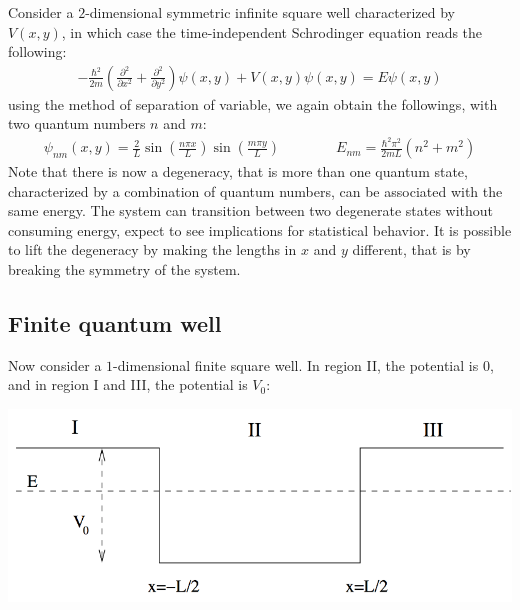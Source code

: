 \documentclass[11pt]{article}
\theoremstyle{break}
\theoremstyle{break}
\begin{document}
Consider a $2$-dimensional symmetric infinite square well characterized by $V(x,y)$, in which case the time-independent Schrodinger equation reads the following:
\begin{align*}
-\frac{\hbar^2}{2m}\left( \frac{\partial^2}{\partial x^2} + \frac{\partial^2}{\partial y^2}\right) \psi(x,y) + V(x,y)\psi(x,y) = E\psi(x,y)
\end{align*}
using the method of separation of variable, we again obtain the followings, with two quantum numbers $n$ and $m$:
\begin{align*}
\psi_{nm}(x,y) = \frac{2}{L}\sin\left( \frac{n\pi x}{L}\right) \sin\left( \frac{m\pi y}{L}\right)\qquad\qquad E_{nm} = \frac{\hbar^2\pi^2}{2mL}(n^2+m^2)
\end{align*}
Note that there is now a degeneracy, that is more than one quantum state, characterized by a combination of quantum numbers, can be associated with the same energy. The system can transition between two degenerate states without consuming energy, expect to see implications for statistical behavior. It is possible to lift the degeneracy by making the lengths in $x$ and $y$ different, that is by breaking the symmetry of the system.\\

\subsection{Finite quantum well}
Now consider a $1$-dimensional finite square well. In region II, the potential is $0$, and in region I and III, the potential is $V_0$:
\begin{center}
\includegraphics[scale=0.39]{quantumWelll.png}
\end{center}
\end{document}
